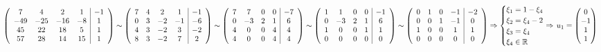 \documentclass{article}
\newcommand{\shiftleft}[3]{\makebox[#1][r]{\makebox[#2][l]{#3}}}
\begin{document}
\begin{center}
$$\left(\begin{array}{cccc|c}
7 & 4 & 2 & 1 & -1\\
-49 & -25 & -16 & -8 & 1\\
45 & 22 & 18 & 5 & 1\\
57 & 28 & 14 & 15 & 1\\
\end{array}\right) \sim \left(\begin{array}{cccc|c}
7 & 4 & 2 & 1 & -1\\
0 & 3 & -2 & -1 & -6\\
4 & 3 & -2 & 3 & -2\\
8 & 3 & -2 & 7 & 2\\
\end{array}\right) \sim \left(\begin{array}{cccc|c}
7 & 7 & 0 & 0 & -7\\
0 & -3 & 2 & 1 & 6\\
4 & 0 & 0 & 4 & 4\\
4 & 0 & 0 & 4 & 4\\
\end{array}\right) \sim \left(\begin{array}{cccc|c}
1 & 1 & 0 & 0 & -1\\
0 & -3 & 2 & 1 & 6\\
1 & 0 & 0 & 1 & 1\\
0 & 0 & 0 & 0 & 0\\
\end{array}\right) \sim \left(\begin{array}{cccc|c}
0 & 1 & 0 & -1 & -2\\
0 & 0 & 1 & -1 & 0\\
1 & 0 & 0 & 1 & 1\\
0 & 0 & 0 & 0 & 0\\
\end{array}\right) \Rightarrow \begin{cases}
\xi_1 = 1 - \xi_4 \\
\xi_2 = \xi_4 - 2 \\
\xi_3 = \xi_4 \\
\xi_4 \in \mathbb{R}
\end{cases} \shiftleft{5pt}{14pt}{$\Rightarrow$} u_1 = \begin{pmatrix}
0 \\ -1 \\ 1 \\ 1
\end{pmatrix}$$
\end{center}
\end{document}
